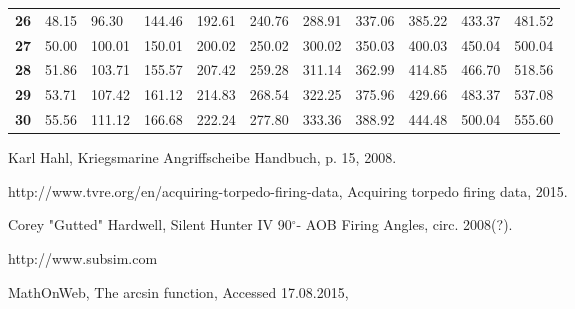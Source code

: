 \documentclass{article}
\newcommand{\degree}{$^{\circ}$}
\begin{document}
\begin{table}[h]
\begin{tabular}{lllllllllll}
\textbf{26}      & 48.15      & 96.30      & 144.46     & 192.61     & 240.76     & 288.91     & 337.06     & 385.22     & 433.37     & 481.52      \\
\textbf{27}      & 50.00      & 100.01     & 150.01     & 200.02     & 250.02     & 300.02     & 350.03     & 400.03     & 450.04     & 500.04      \\
\textbf{28}      & 51.86      & 103.71     & 155.57     & 207.42     & 259.28     & 311.14     & 362.99     & 414.85     & 466.70     & 518.56      \\
\textbf{29}      & 53.71      & 107.42     & 161.12     & 214.83     & 268.54     & 322.25     & 375.96     & 429.66     & 483.37     & 537.08      \\
\textbf{30}      & 55.56      & 111.12     & 166.68     & 222.24     & 277.80     & 333.36     & 388.92     & 444.48     & 500.04     & 555.60     
\end{tabular}
\end{table}






\pagebreak
\begin{thebibliography}{9}

  Karl Hahl,
  Kriegsmarine Angriffscheibe Handbuch,
  p. 15,
  2008.
  
http://www.tvre.org/en/acquiring-torpedo-firing-data,
Acquiring torpedo firing data,
2015.

Corey "Gutted" Hardwell,
Silent Hunter IV 90\degree - AOB Firing Angles,
circ. 2008(?).

http://www.subsim.com

MathOnWeb,
The arcsin function,
Accessed 17.08.2015,


\end{thebibliography}
\end{document}
